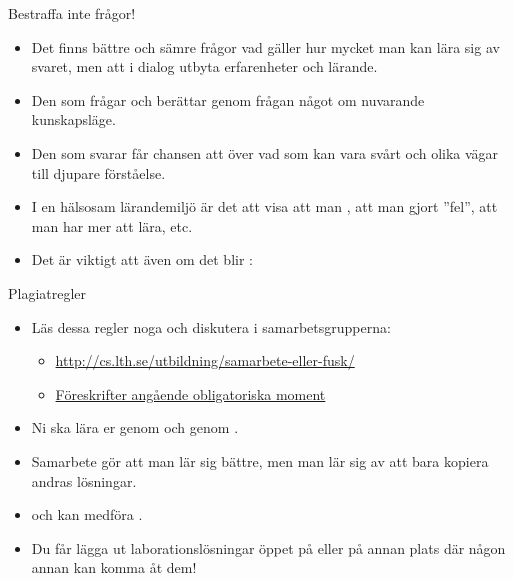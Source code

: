 \begin{Slide}{Bestraffa inte frågor!}
\begin{itemize}
\item Det finns bättre och sämre frågor vad gäller hur mycket man kan lära sig av svaret, men  att i dialog utbyta erfarenheter och lärande.
\item Den som frågar  och berättar genom frågan något om nuvarande kunskapsläge.
\item Den som svarar får chansen att  över vad som kan vara svårt och olika vägar till djupare förståelse.
\item I en hälsosam lärandemiljö är det  att visa att man , att man gjort ''fel'', att man har mer att lära, etc.
\item Det är viktigt att  även om det blir :\\ 
\end{itemize}
\end{Slide}

\begin{Slide}{Plagiatregler}
\begin{itemize}
\item Läs dessa regler noga och diskutera i samarbetsgrupperna:

\begin{itemize}
\footnotesize
\item \url{http://cs.lth.se/utbildning/samarbete-eller-fusk/}
\item \href{http://cs.lth.se/utbildning/foereskrifter-angaaende-obligatoriska-moment/}{Föreskrifter angående obligatoriska moment}
\end{itemize}
\item Ni ska lära er genom  och genom  .
\item Samarbete gör att man lär sig bättre, men man lär sig  av att bara kopiera andras lösningar.
\item {} och kan medföra .
\item Du får  lägga ut laborationslösningar öppet på  eller på annan plats där någon annan kan komma åt dem!
\end{itemize}

\end{Slide}


